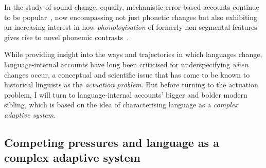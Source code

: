 In the study of sound change, equally, mechanistic error-based accounts continue to be popular~\citep[see e.g.][who make specific reference to the importance of \emph{asymmetries} between phonetic variants to explain change]{Garrett2013}, %
now encompassing not just phonetic changes but also exhibiting an increasing interest in how \emph{phonologisation} of formerly non-segmental features gives rise to novel phonemic contrasts~\citep[e.g.][]{Kirby2013}.

While providing insight into the ways and trajectories in which languages change, language-internal accounts have long been criticised for underspecifying \emph{when} changes occur, a conceptual and scientific issue that has come to be known to historical linguists as the \emph{actuation problem}. But before turning to the actuation problem, I will turn to language-internal accounts' bigger and bolder modern sibling, which is based on the idea of characterising language as a \emph{complex adaptive system}.



\subsection{Competing pressures and language as a complex adaptive system}
\label{sec:lcas}

